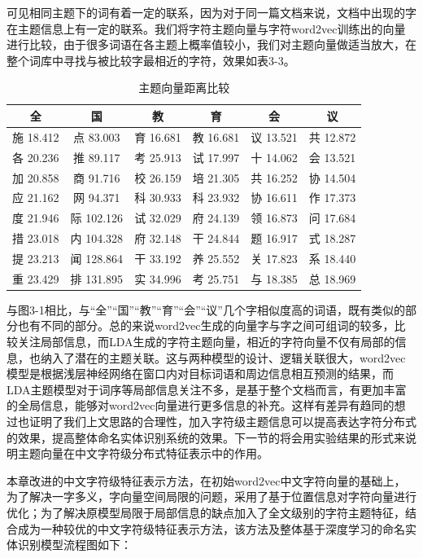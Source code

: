 \documentclass[winfonts,master,oneside,nobackinfo]{njuthesis}
\begin{document}
可见相同主题下的词有着一定的联系，因为对于同一篇文档来说，文档中出现的字在主题信息上有一定的联系。我们将字符主题向量与字符word2vec训练出的向量进行比较，由于很多词语在各主题上概率值较小，我们对主题向量做适当放大，在整个词库中寻找与被比较字最相近的字符，效果如表3-3。

\begin{table}[H]
\centering
\begin{tabular}{cccccc} %
\hline 
全& 国& 教& 育& 会& 议\\
\hline  
施 18.412& 点 83.003& 育 16.681& 教 16.681&议 13.521&共 12.872\\
各 20.236& 推 89.117& 考 25.913& 试 17.997&十 14.062&会 13.521\\
加 20.858& 商 91.716& 校 26.159& 培 21.305&共 16.252&协 14.504\\
应 21.162& 网 94.371& 科 30.933& 科 23.932&协 16.611&作 17.373\\
度 21.946& 际 102.126& 试 32.029& 府 24.139&领 16.873&问 17.684\\
措 23.018& 内 104.328& 府 32.148& 干 24.844&题 16.917&式 18.287\\
提 23.213& 闻 128.864& 干 33.192& 养 25.552&关 17.823&系 18.440\\
重 23.429& 排 131.895& 实 34.996& 考 25.751&与 18.385&总 18.969\\
\hline 
\end{tabular}
\caption{主题向量距离比较}
\end{table}

与图3-1相比，与“全”“国”“教”“育”“会”“议”几个字相似度高的词语，既有类似的部分也有不同的部分。总的来说word2vec生成的向量字与字之间可组词的较多，比较关注局部信息，而LDA生成的字符主题向量，相近的字符向量不仅有局部的信息，也纳入了潜在的主题关联。这与两种模型的设计、逻辑关联很大，word2vec模型是根据浅层神经网络在窗口内对目标词语和周边信息相互预测的结果，而LDA主题模型对于词序等局部信息关注不多，是基于整个文档而言，有更加丰富的全局信息，能够对word2vec向量进行更多信息的补充。这样有差异有趋同的想过也证明了我们上文思路的合理性，加入字符级主题信息可以提高表达字符分布式的效果，提高整体命名实体识别系统的效果。下一节的将会用实验结果的形式来说明主题向量在中文字符级分布式特征表示中的作用。



本章改进的中文字符级特征表示方法，在初始word2vec中文字符向量的基础上，为了解决一字多义，字向量空间局限的问题，采用了基于位置信息对字符向量进行优化；为了解决原模型局限于局部信息的缺点加入了全文级别的字符主题特征，结合成为一种较优的中文字符级特征表示方法，该方法及整体基于深度学习的命名实体识别模型流程图如下：
\end{document}
